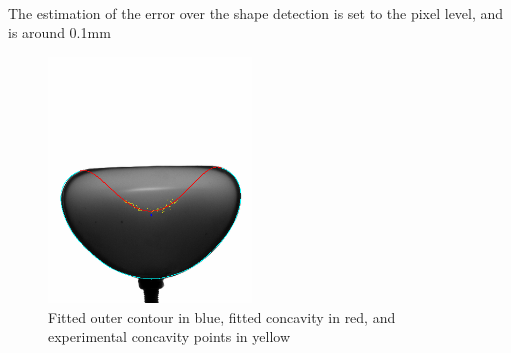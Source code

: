 \paragraph{}
The estimation of the error over the shape detection is set to the pixel level, and is around 0.1mm


\begin{figure}[H] %
	\centering%
  \includegraphics[width=0.48\textwidth]{figures/Chapter_1/outer_contour_complete.png}
	\caption{Fitted outer contour in blue, fitted concavity in red, and experimental concavity points in yellow}
	\label{fig:fit_complet}
\end{figure}
\newpage
